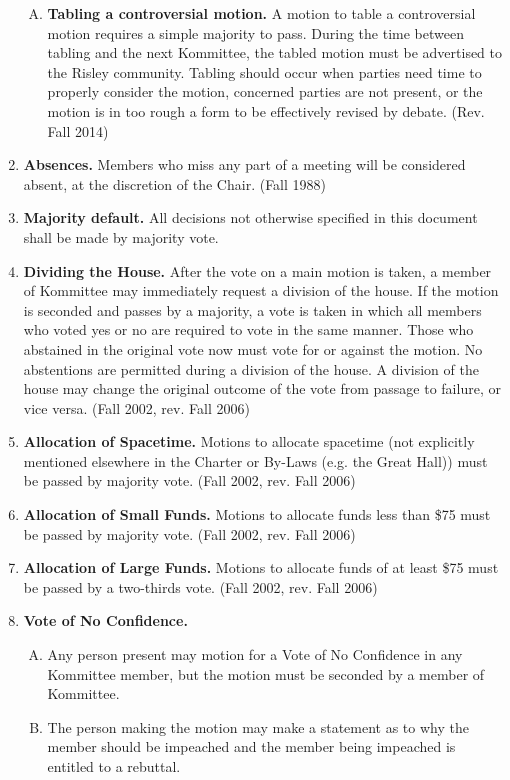 \documentclass[12pt]{article}
\begin{document}
\begin{enumerate}[1.]
\begin{enumerate}[A.]
\item \textbf{Tabling a controversial motion.} A motion to table a controversial motion requires a simple majority to pass. During the time between tabling and the next Kommittee, the tabled motion must be advertised to the Risley community. Tabling should occur when parties need time to properly consider the motion, concerned parties are not present, or the motion is in too rough a form to be effectively revised by debate. (Rev. Fall 2014)
\end{enumerate}
\item \textbf{Absences.} Members who miss any part of a meeting will be considered absent, at the discretion of the Chair. (Fall 1988)
\item \textbf{Majority default.} All decisions not otherwise specified in this document shall be made by majority vote.
\item \textbf{Dividing the House.} After the vote on a main motion is taken, a member of Kommittee may immediately request a division of the house. If the motion is seconded and passes by a majority, a vote is taken in which all members who voted yes or no are required to vote in the same manner. Those who abstained in the original vote now must vote for or against the motion. No abstentions are permitted during a division of the house. A division of the house may change the original outcome of the vote from passage to failure, or vice versa. (Fall 2002, rev. Fall 2006)
\item \textbf{Allocation of Spacetime.} Motions to allocate spacetime (not explicitly mentioned elsewhere in the Charter or By-Laws (e.g. the Great Hall)) must be passed by majority vote. (Fall 2002, rev. Fall 2006)
\item \textbf{Allocation of Small Funds.} Motions to allocate funds less than \$75 must be passed by majority vote. (Fall 2002, rev. Fall 2006)
\item \textbf{Allocation of Large Funds.} Motions to allocate funds of at least \$75 must be passed by a two-thirds vote. (Fall 2002, rev. Fall 2006)
\item \textbf{Vote of No Confidence.}
\begin{enumerate}[A.]
\item Any person present may motion for a Vote of No Confidence in any Kommittee member, but the motion must be seconded by a member of Kommittee. 
\item The person making the motion may make a statement as to why the member should be impeached and the member being impeached is entitled to a rebuttal.

\end{enumerate}
\end{enumerate}
\end{document}
